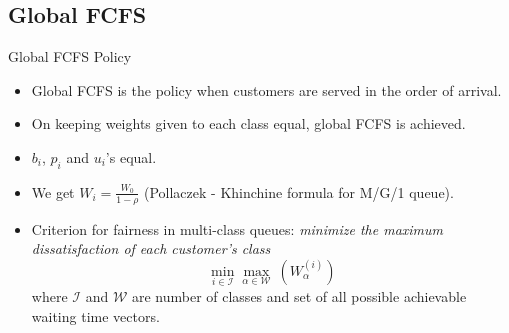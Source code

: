 \documentclass[compress, serif, onlymath, professionalfonts]{beamer}
\begin{document}
\subsection{Global FCFS}
\begin{frame}{Global FCFS Policy}
\begin{itemize}
\item Global FCFS is the policy when customers are served in the order of arrival.
\item On keeping weights given to each class equal, global FCFS is achieved. \item $b_i$, $p_i$ and $u_i$'s equal.
\item We get $W_i = \frac{W_0}{1-\rho}$ (Pollaczek - Khinchine formula for M/G/1 queue).
\item Criterion for fairness in multi-class queues: \textit{minimize the maximum dissatisfaction of each customer's class}
\begin{equation}\nonumber
\min_{i \in \mathcal{I}}\max_{\alpha \in \mathcal{W}}~(W_{\alpha}^{(i)}) 
\end{equation}
where $\mathcal{I}$ and $\mathcal{W}$ are number of classes and set of all possible achievable waiting time vectors.
\end{itemize}
\end{frame}
\end{document}
